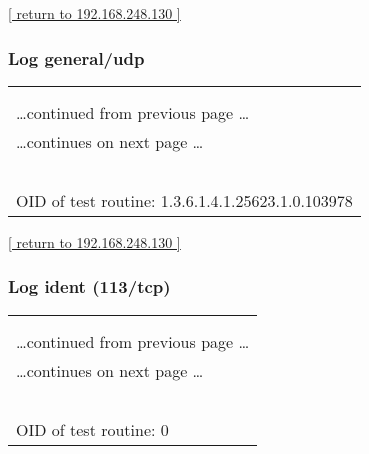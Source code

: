 \documentclass{article}
\begin{document}
\begin{footnotesize}\hyperref[host:192.168.248.130]{[ return to 192.168.248.130 ]}\end{footnotesize}
\subsubsection{Log general/udp}
\label{port:192.168.248.130 general/udp Log}

\begin{longtable}{|p{}|}
\hline
\rowcolor{openvas_log}{\color{white}{Log (CVSS: 0.0) }}\\
\rowcolor{openvas_log}{\color{white}{NVT: Checks for open udp ports}}\\
\hline
\endfirsthead
\hfill\ldots continued from previous page \ldots \\
\hline
\endhead
\hline
\ldots continues on next page \ldots \\
\endfoot
\hline
\endlastfoot
\\
\rowcolor{white}{\verb=Open UDP ports: 514, 68=}\\
\rowcolor{white}{\verb==}\\
\rowcolor{white}{\verb==}\\
\\
OID of test routine: 1.3.6.1.4.1.25623.1.0.103978\\
\end{longtable}

\begin{footnotesize}\hyperref[host:192.168.248.130]{[ return to 192.168.248.130 ]}\end{footnotesize}
\subsubsection{Log ident (113/tcp)}
\label{port:192.168.248.130 ident (113/tcp) Log}

\begin{longtable}{|p{}|}
\hline
\rowcolor{openvas_log}{\color{white}{Log}}\\
\rowcolor{openvas_log}{\color{white}{NVT: }}\\
\hline
\endfirsthead
\hfill\ldots continued from previous page \ldots \\
\hline
\endhead
\hline
\ldots continues on next page \ldots \\
\endfoot
\hline
\endlastfoot
\\
\rowcolor{white}{\verb=Open port.=}\\
\rowcolor{white}{\verb==}\\
\rowcolor{white}{\verb==}\\
\\
OID of test routine: 0\\
\end{longtable}
\end{document}
